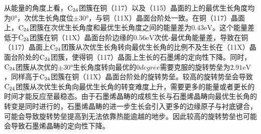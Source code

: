         从能量的角度上看，$\rm{C_{24}}$团簇在铜（117）以及（115）晶面的上的最优生长角度均为$0 \si{\degree}$，次优生长角度位$\pm 30 \si{\degree}$，与铜（11X）晶面台阶处一致。在铜（117）晶面上，$\rm{C_{24}}$团簇在次优生长角度和最优生长角度之间的能量差为$0.43\si{\electronvolt}$。这个能量差低于$\rm{C_{24}}$团簇在铜（11X）晶面台阶边缘的$0.56\si{\electronvolt}$次优-最优角能量差，导致在铜（117）晶面上$\rm{C_{24}}$团簇从次优生长角转向最优生长角的比例不及生长在（11X）晶面台阶处的$\rm{C_{24}}$团簇，使得铜（117）晶面上生长的石墨烯的定向性下降。同时，$\rm{C_{24}}$团簇从次优的$\pm 30 \si{\degree}$生长角度转向最优的$0\si{degree}$需要克服的旋转势垒为$2.91 \si\electronvolt$，同样高于$\rm{C_{24}}$团簇在铜（11X）晶面台阶处的旋转势垒。较高的旋转势垒会导致$\rm{C_{24}}$团簇从次优生长角向最优生长角的转变难度上升，需要更多的能量或者更长的时间才能反应至最稳态。由于石墨烯晶畴的成核生长与石墨烯晶畴向最优生长角的转变是同时进行的，石墨烯晶畴的进一步生长会引入更多的边缘原子与衬底键合，可能会导致旋转势垒提高到无法依靠热能逾越的地步。因此较高的旋转势垒也可能会导致石墨烯晶畴的定向性下降。


